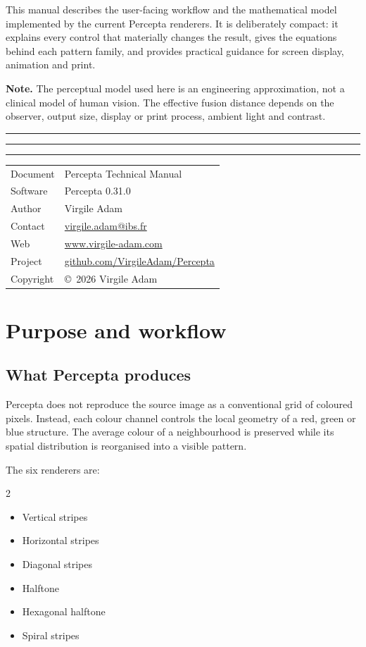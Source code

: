 \documentclass[10.5pt,a4paper]{article}
\newcommand{\RGBbar}{\textcolor{PR}{\rule{0.32\linewidth}{2.3pt}}\hspace{-1pt}\textcolor{PG}{\rule{0.32\linewidth}{2.3pt}}\hspace{-1pt}\textcolor{PB}{\rule{0.32\linewidth}{2.3pt}}}
\newcommand{\note}[1]{\vspace{3pt}\noindent\colorbox{Panel}{\parbox{0.965\linewidth}{\small\textbf{Note.} #1}}\vspace{3pt}}
\begin{document}
This manual describes the user-facing workflow and the mathematical model implemented by the current Percepta renderers. It is deliberately compact: it explains every control that materially changes the result, gives the equations behind each pattern family, and provides practical guidance for screen display, animation and print.

\note{The perceptual model used here is an engineering approximation, not a clinical model of human vision. The effective fusion distance depends on the observer, output size, display or print process, ambient light and contrast.}

\begin{center}\RGBbar\end{center}
\tableofcontents
\vfill
\begin{tabularx}{\linewidth}{@{}lX@{}}
\toprule
Document & Percepta Technical Manual \\
Software & Percepta 0.31.0 \\
Author & Virgile Adam \\
Contact & \href{mailto:virgile.adam@ibs.fr}{virgile.adam@ibs.fr} \\
Web & \href{https://www.virgile-adam.com}{www.virgile-adam.com} \\
Project & \href{https://github.com/VirgileAdam/Percepta}{github.com/VirgileAdam/Percepta} \\
Copyright & \copyright\ 2026 Virgile Adam \\
\bottomrule
\end{tabularx}
\clearpage

\section{Purpose and workflow}
\subsection{What Percepta produces}
Percepta does not reproduce the source image as a conventional grid of coloured pixels. Instead, each colour channel controls the local geometry of a red, green or blue structure. The average colour of a neighbourhood is preserved while its spatial distribution is reorganised into a visible pattern.

The six renderers are:
\begin{multicols}{2}
\begin{itemize}
\item Vertical stripes
\item Horizontal stripes
\item Diagonal stripes
\item Halftone
\item Hexagonal halftone
\item Spiral stripes
\end{itemize}
\end{multicols}
\end{document}
